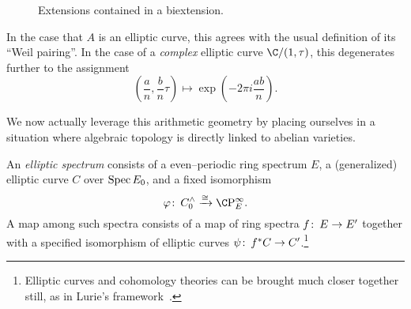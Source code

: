 \begin{figure}
\begin{center}
\hspace{0.5em}
\end{center}
\caption{Extensions contained in a biextension.}
\end{figure}

\begin{remark}
In the case that $A$ is an elliptic curve, this agrees with the usual definition of its ``Weil pairing''.  In the case of a \emph{complex} elliptic curve $\C / (1, \tau)$, this degenerates further to the assignment \[\left( \frac{a}{n}, \frac{b}{n} \tau \right) \mapsto \exp\left(-2\pi i \frac{ab}{n}\right).\]
\end{remark}

We now actually leverage this arithmetic geometry by placing ourselves in a situation where algebraic topology is directly linked to abelian varieties.

\begin{definition}\label{DefnEllipticSpectrum}
An \textit{elliptic spectrum} consists of a even--periodic ring spectrum $E$, a (generalized) elliptic curve $C$ over $\operatorname{Spec} E_0$, and a fixed isomorphism \[\phi\co C^\wedge_0 \xrightarrow{\cong} \CP^\infty_E.\]  A map among such spectra consists of a map of ring spectra $f\colon\thinspace E \to E'$ together with a specified isomorphism of elliptic curves $\psi\colon\thinspace f^* C \to C'$.\footnote{Elliptic curves and cohomology theories can be brought much closer together still, as in Lurie's framework~\cite[Sections 4 and 5.3]{LurieSurveyOfEll}.}
\end{definition}

